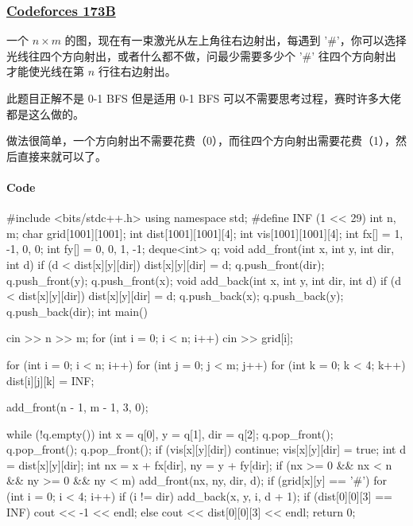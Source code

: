 \subsubsection{\href{http://codeforces.com/problemset/problem/173/B}{Codeforces 173B}}

一个 $n \times m$ 的图，现在有一束激光从左上角往右边射出，每遇到 '\#'，你可以选择光线往四个方向射出，或者什么都不做，问最少需要多少个 '\#' 往四个方向射出才能使光线在第 $n$ 行往右边射出。

此题目正解不是 0-1 BFS 但是适用 0-1 BFS 可以不需要思考过程，赛时许多大佬都是这么做的。

做法很简单，一个方向射出不需要花费（0），而往四个方向射出需要花费（1），然后直接来就可以了。

\paragraph{Code}

\begin{cppcode}
#include <bits/stdc++.h>
using namespace std;
#define INF (1 << 29)
int n, m;
char grid[1001][1001];
int dist[1001][1001][4];
int vis[1001][1001][4];
int fx[] = {1, -1, 0, 0};
int fy[] = {0, 0, 1, -1};
deque<int> q;
void add_front(int x, int y, int dir, int d) {
  if (d < dist[x][y][dir]) {
    dist[x][y][dir] = d;
    q.push_front(dir);
    q.push_front(y);
    q.push_front(x);
  }
}
void add_back(int x, int y, int dir, int d) {
  if (d < dist[x][y][dir]) {
    dist[x][y][dir] = d;
    q.push_back(x);
    q.push_back(y);
    q.push_back(dir);
  }
}
int main() {
  cin >> n >> m;
  for (int i = 0; i < n; i++) cin >> grid[i];

  for (int i = 0; i < n; i++)
    for (int j = 0; j < m; j++)
      for (int k = 0; k < 4; k++) dist[i][j][k] = INF;

  add_front(n - 1, m - 1, 3, 0);

  while (!q.empty()) {
    int x = q[0], y = q[1], dir = q[2];
    q.pop_front();
    q.pop_front();
    q.pop_front();
    if (vis[x][y][dir]) continue;
    vis[x][y][dir] = true;
    int d = dist[x][y][dir];
    int nx = x + fx[dir], ny = y + fy[dir];
    if (nx >= 0 && nx < n && ny >= 0 && ny < m) add_front(nx, ny, dir, d);
    if (grid[x][y] == '#')
      for (int i = 0; i < 4; i++)
        if (i != dir) add_back(x, y, i, d + 1);
  }
  if (dist[0][0][3] == INF)
    cout << -1 << endl;
  else
    cout << dist[0][0][3] << endl;
  return 0;
}
\end{cppcode}

